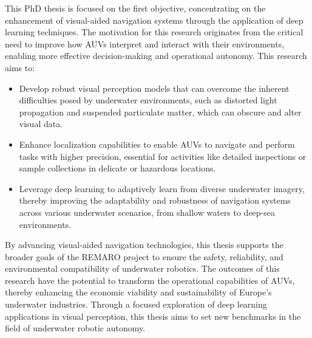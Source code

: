 This PhD thesis is focused on the first objective, concentrating on the enhancement of visual-aided navigation systems through the application of deep learning techniques. The motivation for this research originates from the critical need to improve how AUVs interpret and interact with their environments, enabling more effective decision-making and operational autonomy. This research aims to:
\begin{itemize}
    \item Develop robust visual perception models that can overcome the inherent difficulties posed by underwater environments, such as distorted light propagation and suspended particulate matter, which can obscure and alter visual data.
    \item Enhance localization capabilities to enable AUVs to navigate and perform tasks with higher precision, essential for activities like detailed inspections or sample collections in delicate or hazardous locations.
    \item Leverage deep learning to adaptively learn from diverse underwater imagery, thereby improving the adaptability and robustness of navigation systems across various underwater scenarios, from shallow waters to deep-sea environments.
\end{itemize}

By advancing visual-aided navigation technologies, this thesis supports the broader goals of the REMARO project to ensure the safety, reliability, and environmental compatibility of underwater robotics. The outcomes of this research have the potential to transform the operational capabilities of AUVs, thereby enhancing the economic viability and sustainability of Europe’s underwater industries. Through a focused exploration of deep learning applications in visual perception, this thesis aims to set new benchmarks in the field of underwater robotic autonomy.

